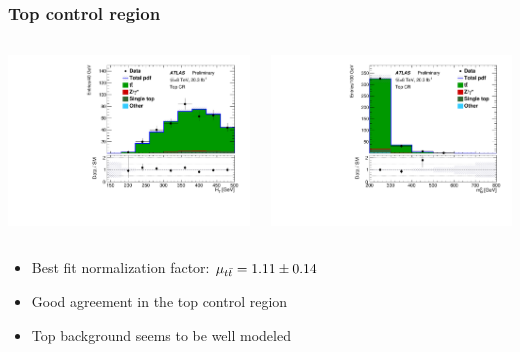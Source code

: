 \documentclass[10pt, svgnames]{beamer}
\begin{document}
\begin{frame}
  \frametitle{Top control region}
  \begin{columns}
    \begin{block}{\HT}
      \includegraphics[width=\textwidth]{figures/blstop/cr_top_ht_signal.pdf}
    \end{block}
    \begin{block}{\MBL}
      \includegraphics[width=\textwidth]{figures/blstop/cr_top_mbl_0.pdf}
    \end{block}
  \end{columns}
  \begin{itemize}
    \item Best fit normalization factor: $\mu_{t\bar{t}} = 1.11 \pm 0.14$
    \item Good agreement in the top control region
    \item Top background seems to be well modeled
  \end{itemize}
\end{frame}
\end{document}
